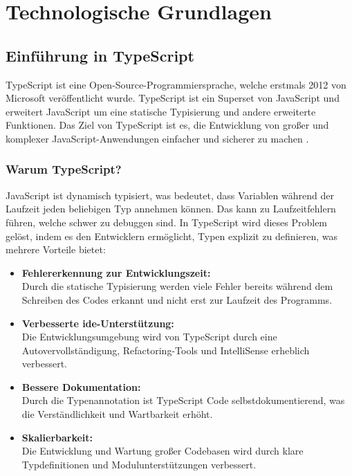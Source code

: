 \newpage
\section{Technologische Grundlagen}
\subsection[Einführung in TypeScript]{Einführung in TypeScript}
TypeScript ist eine Open-Source-Programmiersprache, welche erstmals 2012 von Microsoft veröffentlicht wurde. \cite{typescript_docu}
TypeScript ist ein Superset von JavaScript und erweitert JavaScript um eine statische Typisierung und andere erweiterte Funktionen.
Das Ziel von TypeScript ist es, die Entwicklung von großer und komplexer JavaScript-Anwendungen einfacher und sicherer zu machen \cite{why_typescript}.
\subsubsection[Warum TypeScript?]{Warum TypeScript?}
JavaScript ist dynamisch typisiert, was bedeutet, dass Variablen während der Laufzeit jeden beliebigen Typ annehmen können. Das kann zu Laufzeitfehlern führen, welche schwer zu debuggen sind.
In TypeScript wird dieses Problem gelöst, indem es den Entwicklern ermöglicht, Typen explizit zu definieren, was mehrere Vorteile bietet:

\begin{itemize}
    \item \textbf{Fehlererkennung zur Entwicklungszeit:} \\   Durch die statische Typisierung werden viele Fehler bereits während dem Schreiben des Codes erkannt und nicht erst zur Laufzeit des Programms.
    \item \textbf{Verbesserte \gls{ide}-Unterstützung:} \\    Die Entwicklungsumgebung wird von TypeScript durch eine Autovervollständigung, Refactoring-Tools und IntelliSense erheblich verbessert. \cite{typescript_in_vscode}
    \item \textbf{Bessere Dokumentation:} \\     Durch die Typenannotation ist TypeScript Code selbstdokumentierend, was die Verständlichkeit und Wartbarkeit erhöht.
    \item \textbf{Skalierbarkeit:} \\   Die Entwicklung und Wartung großer Codebasen wird durch klare Typdefinitionen und Modulunterstützungen verbessert.  
\end{itemize}

